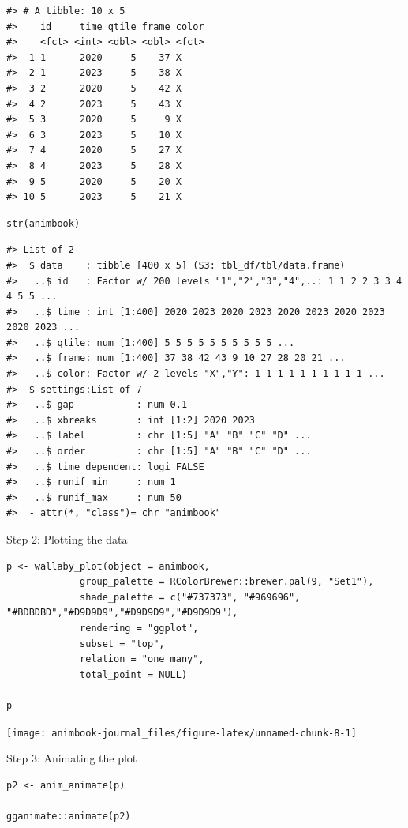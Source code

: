 \begin{verbatim}
#> # A tibble: 10 x 5
#>    id     time qtile frame color
#>    <fct> <int> <dbl> <dbl> <fct>
#>  1 1      2020     5    37 X    
#>  2 1      2023     5    38 X    
#>  3 2      2020     5    42 X    
#>  4 2      2023     5    43 X    
#>  5 3      2020     5     9 X    
#>  6 3      2023     5    10 X    
#>  7 4      2020     5    27 X    
#>  8 4      2023     5    28 X    
#>  9 5      2020     5    20 X    
#> 10 5      2023     5    21 X
\end{verbatim}

\begin{verbatim}
str(animbook)
\end{verbatim}

\begin{verbatim}
#> List of 2
#>  $ data    : tibble [400 x 5] (S3: tbl_df/tbl/data.frame)
#>   ..$ id   : Factor w/ 200 levels "1","2","3","4",..: 1 1 2 2 3 3 4 4 5 5 ...
#>   ..$ time : int [1:400] 2020 2023 2020 2023 2020 2023 2020 2023 2020 2023 ...
#>   ..$ qtile: num [1:400] 5 5 5 5 5 5 5 5 5 5 ...
#>   ..$ frame: num [1:400] 37 38 42 43 9 10 27 28 20 21 ...
#>   ..$ color: Factor w/ 2 levels "X","Y": 1 1 1 1 1 1 1 1 1 1 ...
#>  $ settings:List of 7
#>   ..$ gap           : num 0.1
#>   ..$ xbreaks       : int [1:2] 2020 2023
#>   ..$ label         : chr [1:5] "A" "B" "C" "D" ...
#>   ..$ order         : chr [1:5] "A" "B" "C" "D" ...
#>   ..$ time_dependent: logi FALSE
#>   ..$ runif_min     : num 1
#>   ..$ runif_max     : num 50
#>  - attr(*, "class")= chr "animbook"
\end{verbatim}

Step 2: Plotting the data

\begin{verbatim}
p <- wallaby_plot(object = animbook,
             group_palette = RColorBrewer::brewer.pal(9, "Set1"),
             shade_palette = c("#737373", "#969696", "#BDBDBD","#D9D9D9","#D9D9D9","#D9D9D9"),
             rendering = "ggplot",
             subset = "top",
             relation = "one_many",
             total_point = NULL)

p
\end{verbatim}

\begin{center}\texttt{[image: animbook-journal\_files/figure-latex/unnamed-chunk-8-1]} \end{center}

Step 3: Animating the plot

\begin{verbatim}
p2 <- anim_animate(p)

gganimate::animate(p2)
\end{verbatim}

